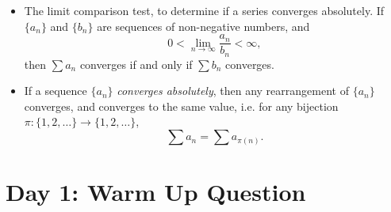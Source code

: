 \documentclass[answers]{exam}
\theoremstyle{problemstyle}
\newcommand{\1}[1]{\textbf{1}_{\left[#1\right]}} %
\begin{document}
\begin{itemize}
	\item The limit comparison test, to determine if a series converges absolutely. If $\{ a_n \}$ and $\{ b_n \}$ are sequences of non-negative numbers, and
	\[ 0 < \lim_{n \to \infty} \frac{a_n}{b_n} < \infty, \]
	then $\sum a_n$ converges if and only if $\sum b_n$ converges.

	\item If a sequence $\{ a_n \}$ \emph{converges absolutely}, then any rearrangement of $\{ a_n \}$ converges, and converges to the same value, i.e. for any bijection $\pi: \{ 1, 2, \dots \} \to \{ 1, 2, \dots \}$,
	\[ \sum a_n = \sum a_{\pi(n)}. \]
\end{itemize}

\newpage

\section*{Day 1: Warm Up Question}
\end{document}
